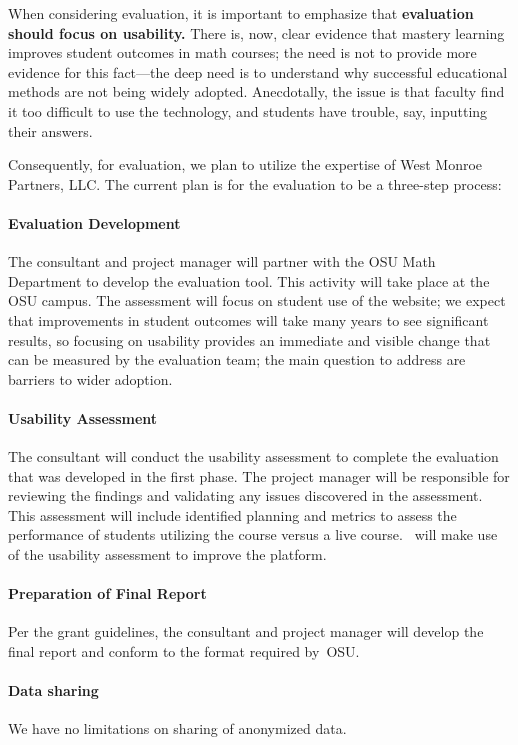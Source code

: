 When considering evaluation, it is important to emphasize that
\textbf{evaluation should focus on usability.}  There is, now, clear
evidence that mastery learning improves student outcomes in math
courses; the need is not to provide more evidence for this fact---the
deep need is to understand why successful educational methods are not
being widely adopted.  Anecdotally, the issue is that faculty find it
too difficult to use the technology, and students have trouble, say,
inputting their answers.

Consequently, for evaluation, we plan to utilize the expertise of West
Monroe Partners, LLC. The current plan is for the evaluation to be a
three-step process:
\paragraph{Evaluation Development} The consultant and project
  manager will partner with the OSU Math Department to develop the
  evaluation tool.  This activity will take place at the OSU campus.  The assessment will focus on student use of the website; we expect that improvements in student outcomes will take many years to see significant results, so focusing on usability provides an immediate and visible change that can be measured by the evaluation team; the main question to address are barriers to wider adoption.
\paragraph{Usability Assessment} The consultant will conduct the usability
  assessment to complete the evaluation that was developed in the
  first phase.  The project manager will be responsible for reviewing
  the findings and validating any issues discovered in the assessment.
  This assessment will include identified planning and metrics to
  assess the performance of students utilizing the course versus a
  live course.  \gratisu\ will make use of the usability assessment to improve the platform.
\paragraph{Preparation of Final Report} Per the grant guidelines, the
  consultant and project manager will develop the final report and
  conform to the format required by~OSU.

\paragraph{Data sharing} We have no limitations on sharing of anonymized data.
